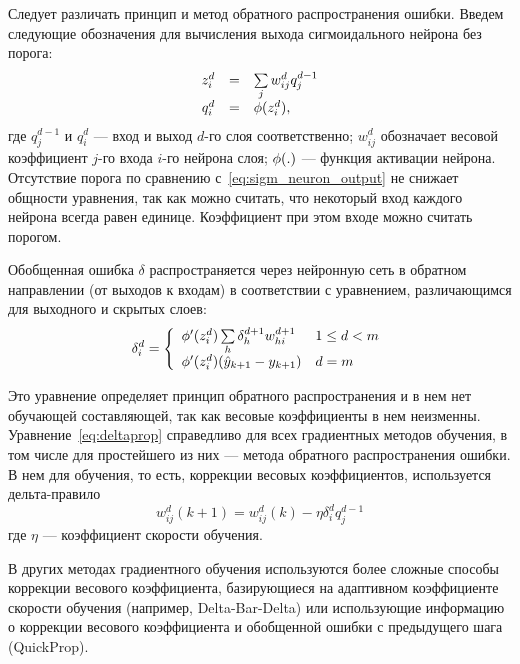 Следует различать принцип и метод обратного распространения ошибки.
Введем следующие обозначения для вычисления выхода сигмоидального
нейрона без порога:
\begin{equation}
\label{eq:sigm_neuron_output_parts}
\begin{array}{rcl}
  z^d_i & = & \sum\limits_j w^d_{ij}q^{d-1}_j \\
  q^d_i & = & \fa(z^d_i),
\end{array}
\end{equation} где $q^{d-1}_j$ и $q^d_i$ --- вход и выход $d$-го слоя
соответственно; $w^d_{ij}$ обозначает весовой коэффициент $j$-го входа
$i$-го нейрона слоя; $\phi(.)$ --- функция активации нейрона.
Отсутствие порога по сравнению с~\eqref{eq:sigm_neuron_output} не
снижает общности уравнения, так как можно считать, что некоторый вход
каждого нейрона всегда равен единице.  Коэффициент при этом входе
можно считать порогом.

Обобщенная ошибка $\delta$ распространяется через нейронную сеть в
обратном направлении (от выходов к входам) в соответствии с
уравнением, различающимся для выходного и скрытых слоев:
\begin{equation}
\label{eq:deltaprop}
  \delta^d_i=\left\{\begin{array}{ll}
    \fa'(z^d_i)\sum\limits_h\delta^{d+1}_h w^{d+1}_{hi} & 1\le d<m \\
    \fa'(z^d_i)(\hat{y}_{k+1}-y_{k+1}) & d=m \\
  \end{array}\right.
\end{equation}

Это уравнение определяет принцип обратного распространения и в нем нет
обучающей составляющей, так как весовые коэффициенты в нем неизменны.
Уравнение~\eqref{eq:deltaprop} справедливо для всех градиентных
методов обучения, в том числе для простейшего из них --- метода
обратного распространения ошибки.  В нем для обучения, то есть,
коррекции весовых коэффициентов, используется дельта-правило
\begin{equation}
\label{eq:weightchange}
  w^d_{ij}(k+1)=w^d_{ij}(k)-\eta\delta^d_i q^{d-1}_j
\end{equation} где $\eta$ --- коэффициент скорости обучения.

В других методах градиентного обучения используются более сложные
способы коррекции весового коэффициента, базирующиеся на адаптивном
коэффициенте скорости обучения (например, Delta-Bar-Delta) или
использующие информацию о коррекции весового коэффициента и обобщенной
ошибки с предыдущего шага (QuickProp).

